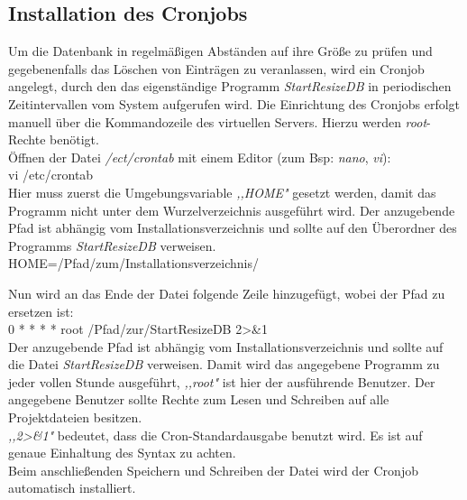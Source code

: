 \documentclass[fontsize = 12pt, paper = a4]{scrreprt}
\begin{document}
\subsection{Installation des Cronjobs}

Um die Datenbank in regelmäßigen Abständen auf ihre Größe zu prüfen und gegebenenfalls das Löschen von Einträgen zu veranlassen, wird ein Cronjob angelegt, durch den das eigenständige Programm \textit{StartResizeDB} in periodischen Zeitintervallen vom System aufgerufen wird.
Die Einrichtung des Cronjobs erfolgt manuell über die Kommandozeile des virtuellen Servers. Hierzu werden \textit{root}-Rechte benötigt.\\

Öffnen der Datei \textit{/ect/crontab} mit einem Editor (zum Bsp: \textit{nano}, \textit{vi}):\\

  vi /etc/crontab    \\

Hier muss zuerst die Umgebungsvariable \textit{,,HOME"} gesetzt werden, damit das Programm nicht unter dem Wurzelverzeichnis ausgeführt wird. Der anzugebende Pfad ist abhängig vom Installationsverzeichnis und sollte auf den Überordner des Programms \textit{StartResizeDB} verweisen.\\
 
  HOME=/Pfad/zum/Installationsverzeichnis/

Nun wird an das Ende der Datei folgende Zeile hinzugefügt, wobei der Pfad zu ersetzen ist:\\

  0 * * * * root /Pfad/zur/StartResizeDB 2\textgreater\&1 \\

Der anzugebende Pfad ist abhängig vom Installationsverzeichnis und sollte auf die Datei \textit{StartResizeDB} verweisen.
Damit wird das angegebene Programm zu jeder vollen Stunde ausgeführt, \textit{,,root"} ist hier der ausführende Benutzer. Der angegebene Benutzer sollte Rechte zum Lesen und Schreiben auf alle Projektdateien besitzen.\\
\textit{,,2\textgreater\&1"} bedeutet, dass die Cron-Standardausgabe benutzt wird.
Es ist auf genaue Einhaltung des Syntax zu achten.\\
Beim anschließenden Speichern und Schreiben der Datei wird der Cronjob automatisch installiert.
\end{document}

